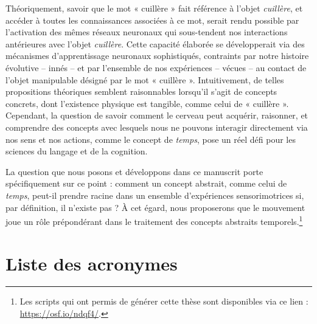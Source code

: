 \documentclass[
  a4paper,12pt,twoside,onecolumn,openright,final,oldfontcommands]{memoir}
\newcommand{\clearemptydoublepage}{\newpage{\thispagestyle{empty}\cleardoublepage}}
\begin{document}
Théoriquement, savoir que le mot « cuillère » fait référence à l'objet \emph{cuillère}, et accéder à toutes les connaissances associées à ce mot, serait rendu possible par l'activation des mêmes réseaux neuronaux qui sous-tendent nos interactions antérieures avec l'objet \emph{cuillère}. Cette capacité élaborée se développerait via des mécanismes d'apprentissage neuronaux sophistiqués, contraints par notre histoire évolutive -- innés -- et par l'ensemble de nos expériences -- vécues -- au contact de l'objet manipulable désigné par le mot « cuillère ». Intuitivement, de telles propositions théoriques semblent raisonnables lorsqu'il s'agit de concepts concrets, dont l'existence physique est tangible, comme celui de « cuillère ». Cependant, la question de savoir comment le cerveau peut acquérir, raisonner, et comprendre des concepts avec lesquels nous ne pouvons interagir directement via nos sens et nos actions, comme le concept de \emph{temps}, pose un réel défi pour les sciences du langage et de la cognition.

La question que nous posons et développons dans ce manuscrit porte spécifiquement sur ce point : comment un concept abstrait, comme celui de \emph{temps}, peut-il prendre racine dans un ensemble d'expériences sensorimotrices si, par définition, il n'existe pas ? À cet égard, nous proposerons que le mouvement joue un rôle prépondérant dans le traitement des concepts abstraits temporels.\footnote{Les scripts qui ont permis de générer cette thèse sont disponibles via ce lien : \url{https://osf.io/ndqf4/}.}

\clearemptydoublepage

\renewcommand{\contentsname}{Table des matières}

\tableofcontents*
{}
\newpage

\renewcommand\listfigurename{Liste des figures}

\listoffigures
{}
\newpage

\chapter*{Liste des acronymes}
\end{document}
